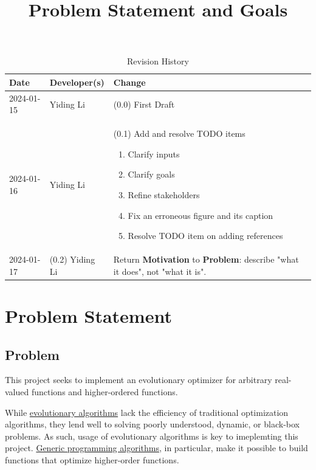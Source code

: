 \documentclass{article}
\title{Problem Statement and Goals\\\progname}
\author{\authname}
\date{}
\begin{document}
\maketitle

\begin{table}[hp]
\caption{Revision History} \label{TblRevisionHistory}
\begin{tabularx}{\textwidth}{llX}
\toprule
\textbf{Date} & \textbf{Developer(s)} & \textbf{Change}\\
\midrule
2024-01-15 & Yiding Li & (0.0) First Draft\\
2024-01-16 & Yiding Li & (0.1) Add and resolve TODO items
\begin{enumerate}
    \item Clarify inputs
    \item Clarify goals
    \item Refine stakeholders
    \item Fix an erroneous figure and its caption
    \item Resolve TODO item on adding references
\end{enumerate}
\\
2024-01-17 & (0.2) Yiding Li & Return \textbf{Motivation} to \textbf{Problem}: describe "what it does", not "what it is".\\
\bottomrule
\end{tabularx}
\end{table}

\section{Problem Statement}


\subsection{Problem}

This project seeks to implement an evolutionary optimizer for arbitrary real-valued functions and higher-ordered functions.

While \hyperref[sec:evalg]{evolutionary algorithms} lack the efficiency of traditional optimization algorithms, they lend well to solving poorly understood, dynamic, or black-box problems. As such, usage of evolutionary algorithms is key to imeplemting this project. \hyperref[sec:genalg]{Generic programming algorithms}, in particular, make it possible to build functions that optimize higher-order functions.
\end{document}
